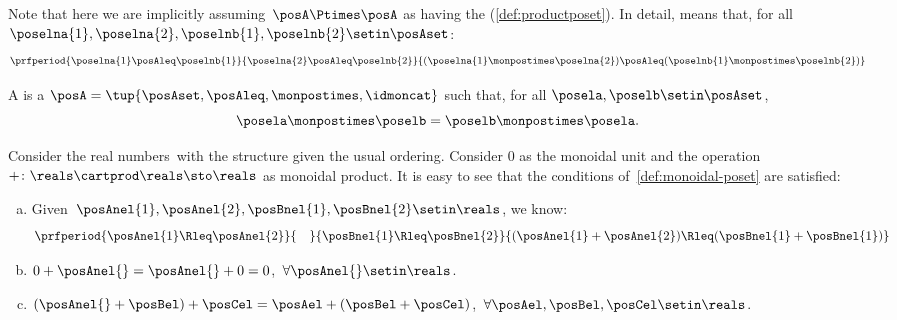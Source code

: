 Note that here we are implicitly assuming~$\posA \Ptimes \posA$ as having the  (\cref{def:productposet}).
In detail,  means that, for all~$\poselna{1}, \poselna{2}, \poselnb{1}, \poselnb{2} \setin \posAset$:
\begin{equation}
    \prfperiod{
        \poselna{1} \posAleq \poselnb{1}}{\poselna{2} \posAleq \poselnb{2}}{ (\poselna{1} \monpostimes  \poselna{2}) \posAleq  (\poselnb{1} \monpostimes  \poselnb{2})}
\end{equation}

\begin{ctdefinition}
    \label{def:sym-monoidal-poset}
    A  is a  $\posA=\tup{\posAset, {\posAleq}, {\monpostimes}, \idmoncat}$ such that, for all $\posela, \poselb \setin \posAset$,
    \begin{equation}
        \posela \monpostimes \poselb = \poselb \monpostimes \posela.
    \end{equation}
\end{ctdefinition}

\begin{example}
    \label{ex:monoidal-pos-reals}
    Consider the real numbers~\reals with the  structure given the usual ordering.
    Consider 0 as the monoidal unit and the operation~$+\colon \reals\cartprod \reals\sto \reals$ as monoidal product.
    It is easy to see that the conditions of~\cref{def:monoidal-poset} are satisfied:
    \begin{enumerate}[(a)]
        \item Given~$\posAnel{1},\posAnel{2},\posBnel{1},\posBnel{2}\setin \reals$, we know:
              \begin{equation}
                  \prfperiod{
                      \posAnel{1}\Rleq  \posAnel{2}
                  }{\quad}{
                      \posBnel{1}\Rleq  \posBnel{2}
                  }{
                      (\posAnel{1}+\posAnel{2}) \Rleq  (\posBnel{1}+\posBnel{1})
                  }
              \end{equation}
        \item $0+\posAnel{}=\posAnel{}+0=0$,~$\forall \posAnel{}\setin \reals$.
        \item $(\posAnel{}+\posBel)+\posCel=\posAel+(\posBel+\posCel)$,~$\forall \posAel,\posBel,\posCel\setin \reals$.
    \end{enumerate}
\end{example}

